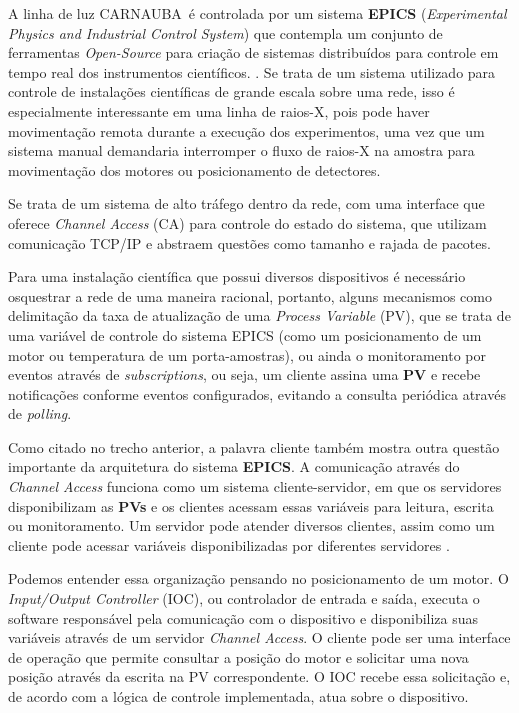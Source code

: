 \documentclass[12pt,a4paper]{article}
\newcommand{\CNB}{CARNAUBA}
\begin{document}
A linha de luz \CNB\ é controlada por um sistema \textbf{EPICS} (\textit{Experimental Physics and Industrial Control System}) que contempla um conjunto de ferramentas \textit{Open-Source} para criação de sistemas distribuídos para controle em tempo real dos instrumentos científicos. \cite{national_instruments}.
Se trata de um sistema utilizado para controle de instalações científicas de grande escala sobre uma rede, isso é especialmente interessante em uma linha de raios-X, 
pois pode haver movimentação remota durante a execução dos experimentos, uma vez que um sistema manual demandaria interromper o fluxo de raios-X na amostra para movimentação dos motores ou posicionamento de detectores.

Se trata de um sistema de alto tráfego dentro da rede, com uma interface que oferece \textit{Channel Access} (CA) para controle do estado do sistema, que utilizam comunicação TCP/IP e abstraem questões como tamanho e rajada de pacotes.

Para uma instalação científica que possui diversos dispositivos é necessário osquestrar a rede de uma maneira racional, portanto, alguns mecanismos como delimitação da taxa de atualização de uma \textit{Process Variable} (PV), que se trata de uma variável de controle do sistema EPICS  
(como um posicionamento de um motor ou temperatura de um porta-amostras), ou ainda o monitoramento por eventos através de \textit{subscriptions}, ou seja, um cliente assina uma \textbf{PV} e recebe notificações conforme eventos configurados, evitando a consulta periódica através de \textit{polling}.

Como citado no trecho anterior, a palavra cliente também mostra outra questão importante da arquitetura do sistema \textbf{EPICS}. A comunicação através do \textit{Channel Access} funciona como um sistema cliente-servidor, em que os servidores disponibilizam as \textbf{PVs} e os clientes acessam essas variáveis para leitura, escrita ou monitoramento. Um servidor pode atender diversos clientes, assim como um cliente pode acessar variáveis disponibilizadas por diferentes servidores \cite{epics_arquitetura}.

Podemos entender essa organização pensando no posicionamento de um motor. O \textit{Input/Output Controller} (IOC), ou controlador de entrada e saída, executa o software responsável pela comunicação com o dispositivo e disponibiliza suas variáveis através de um servidor \textit{Channel Access}. O cliente pode ser uma interface de operação que permite consultar a posição do motor e solicitar uma nova posição através da escrita na PV correspondente. O IOC recebe essa solicitação e, de acordo com a lógica de controle implementada, atua sobre o dispositivo.
\end{document}
